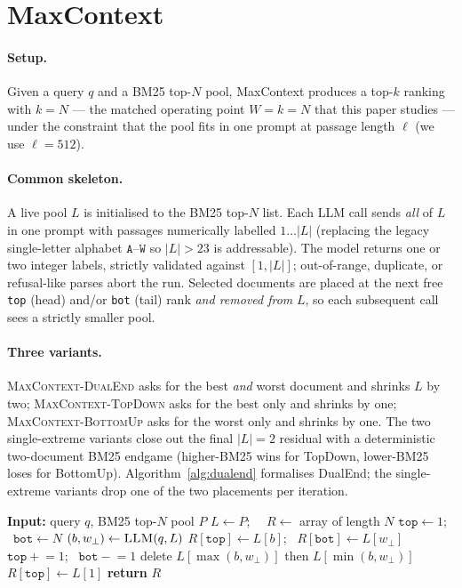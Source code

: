 \section{MaxContext}
\label{sec:methodology}

\paragraph{Setup.} Given a query $q$ and a BM25 top-$N$ pool, MaxContext
produces a top-$k$ ranking with $k = N$ — the matched operating point
$W = k = N$ that this paper studies — under the constraint that the pool
fits in one prompt at passage length $\ell$ (we use $\ell = 512$).

\paragraph{Common skeleton.} A live pool $L$ is initialised to the BM25
top-$N$ list. Each LLM call sends \emph{all} of $L$ in one prompt with
passages numerically labelled $1\dots|L|$ (replacing the legacy
single-letter alphabet $\texttt{A}$--$\texttt{W}$ so $|L| > 23$ is
addressable). The model returns one or two integer labels, strictly
validated against $[1, |L|]$; out-of-range, duplicate, or refusal-like
parses abort the run. Selected documents are placed at the next free
\texttt{top} (head) and/or \texttt{bot} (tail) rank \emph{and removed
from} $L$, so each subsequent call sees a strictly smaller pool.

\paragraph{Three variants.} \textsc{MaxContext-DualEnd} asks for the best
\emph{and} worst document and shrinks $L$ by two; \textsc{MaxContext-TopDown}
asks for the best only and shrinks by one; \textsc{MaxContext-BottomUp}
asks for the worst only and shrinks by one. The two single-extreme
variants close out the final $|L|=2$ residual with a deterministic
two-document BM25 endgame (higher-BM25 wins for TopDown, lower-BM25 loses
for BottomUp). Algorithm~\ref{alg:dualend} formalises DualEnd; the
single-extreme variants drop one of the two placements per iteration.

\begin{algorithm}[t]
\small
\caption{MaxContext-DualEnd}
\label{alg:dualend}
\begin{algorithmic}[1]
\State \textbf{Input:} query $q$, BM25 top-$N$ pool $P$
\State $L \gets P$; \ \ $R \gets$ array of length $N$
\State $\texttt{top} \gets 1$; \ $\texttt{bot} \gets N$
  \State $(b, w_{\bot}) \gets \textsc{LLM}(q, L)$ 
  \State $R[\texttt{top}] \gets L[b]$; \ $R[\texttt{bot}] \gets L[w_{\bot}]$
  \State $\texttt{top}\mathrel{+}=1$; \ $\texttt{bot}\mathrel{-}=1$
  \State delete $L[\max(b,w_{\bot})]$ then $L[\min(b,w_{\bot})]$
\EndWhile
{} $R[\texttt{top}] \gets L[1]$ \EndIf
\State \textbf{return} $R$
\end{algorithmic}
\end{algorithm}

